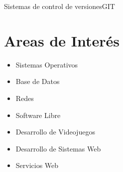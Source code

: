 \documentclass[10pt,a4paper]{moderncv}
\begin{document}
				{Sistemas de control de versiones}{GIT}	


\section{Areas de Inter\'es}
	\begin{itemize}
		\item{Sistemas Operativos} 
		\item{Base de Datos} 
		\item{Redes}
		\item{Software Libre} 
    \item{Desarrollo de Videojuegos}
    \item{Desarrollo de Sistemas Web}
    \item{Servicios Web}
	\end{itemize}
\end{document}
